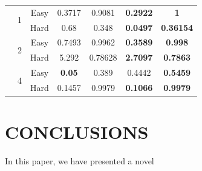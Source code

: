 \documentclass{svproc}
\begin{document}
\begin{table}[h]
\begin{center}
\begin{tabular}{ccccccc}
                                   &  \multirow{2}{*}{1}   &  \multicolumn{1}{c}{Easy}  & \multicolumn{1}{c}{0.3717} & \multicolumn{1}{c}{0.9081} & \multicolumn{1}{c}{\textbf{0.2922}}  & \multicolumn{1}{c}{\textbf{1}}   \\
  \cline{3-7}
                                                          & \multicolumn{1}{c}{} &  \multicolumn{1}{c}{Hard}  & \multicolumn{1}{c}{0.68} & \multicolumn{1}{c}{0.348} & \multicolumn{1}{c}{\textbf{0.0497}}  & \multicolumn{1}{c}{\textbf{0.36154}}   \\
  \cline{2-7}
                                    &  \multirow{2}{*}{2}   &  \multicolumn{1}{c}{Easy}  & \multicolumn{1}{c}{0.7493} & \multicolumn{1}{c}{0.9962} & \multicolumn{1}{c}{\textbf{0.3589}}  & \multicolumn{1}{c}{\textbf{0.998}}   \\
  \cline{3-7}
                                                          & \multicolumn{1}{c}{} &  \multicolumn{1}{c}{Hard}  & \multicolumn{1}{c}{5.292} & \multicolumn{1}{c}{0.78628} & \multicolumn{1}{c}{\textbf{2.7097}}  & \multicolumn{1}{c}{\textbf{0.7863}}   \\
  \cline{2-7}
                                    &  \multirow{2}{*}{4}   &  \multicolumn{1}{c}{Easy}  & \multicolumn{1}{c}{\textbf{0.05}} & \multicolumn{1}{c}{0.389} & \multicolumn{1}{c}{0.4442}  & \multicolumn{1}{c}{\textbf{0.5459}}   \\
  \cline{3-7}
                                                          & \multicolumn{1}{c}{} &  \multicolumn{1}{c}{Hard}  & \multicolumn{1}{c}{0.1457} & \multicolumn{1}{c}{0.9979} & \multicolumn{1}{c}{\textbf{0.1066}}  & \multicolumn{1}{c}{\textbf{0.9979}}   \\

\midrule
\toprule
\end{tabular} 
\end{center}
\end{table}
\vspace{-0.47cm}


\section{CONCLUSIONS}

In this paper, we have presented a novel


\end{document}

